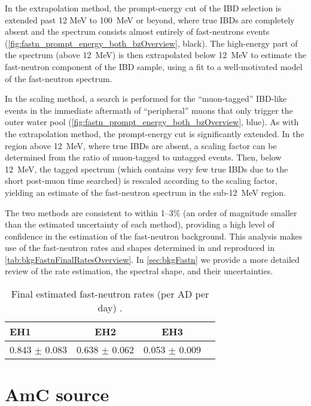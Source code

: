 \documentclass[../thesis.tex]{subfiles}
\begin{document}
In the extrapolation method, the prompt-energy cut of the IBD selection is extended past 12 MeV to 100~MeV or beyond, where true IBDs are completely absent and the spectrum consists almost entirely of fast-neutrons events (\autoref{fig:fastn_prompt_energy_both_bzOverview}, black). The high-energy part of the spectrum (above 12~MeV) is then extrapolated below 12~MeV to estimate the fast-neutron component of the IBD sample, using a fit to a well-motivated model of the fast-neutron spectrum.

In the scaling method, a search is performed for the ``muon-tagged'' IBD-like events in the immediate aftermath of ``peripheral'' muons that only trigger the outer water pool (\autoref{fig:fastn_prompt_energy_both_bzOverview}, blue). As with the extrapolation method, the prompt-energy cut is significantly extended. In the region above 12~MeV, where true IBDs are absent, a scaling factor can be determined from the ratio of muon-tagged to untagged events. Then, below 12~MeV, the tagged spectrum (which contains very few true IBDs due to the short post-muon time searched) is rescaled according to the scaling factor, yielding an estimate of the fast-neutron spectrum in the sub-12~MeV region.

The two methods are consistent to within 1--3\% (an order of magnitude smaller than the estimated uncertainty of each method), providing a high level of confidence in the estimation of the fast-neutron background. This analysis makes use of the fast-neutron rates and shapes determined in \cite{fastn} and reproduced in \autoref{tab:bkgFastnFinalRatesOverview}. In \autoref{sec:bkgFastn} we provide a more detailed review of the rate estimation, the spectral shape, and their uncertainties.

\begin{table}[ht]
  \begin{tabular}{lccc}
    \toprule
    EH1 & EH2 & EH3 \\
    \midrule
    0.843 $\pm$ 0.083 & 0.638 $\pm$ 0.062 & 0.053 $\pm$ 0.009 \\
    \bottomrule
  \end{tabular}
  \caption{Final estimated fast-neutron rates (per AD per day) \cite{fastn}.}
  \label{tab:bkgFastnFinalRatesOverview}
\end{table}


\section{AmC source}
\label{sec:bkgAmCOverview}
\end{document}
